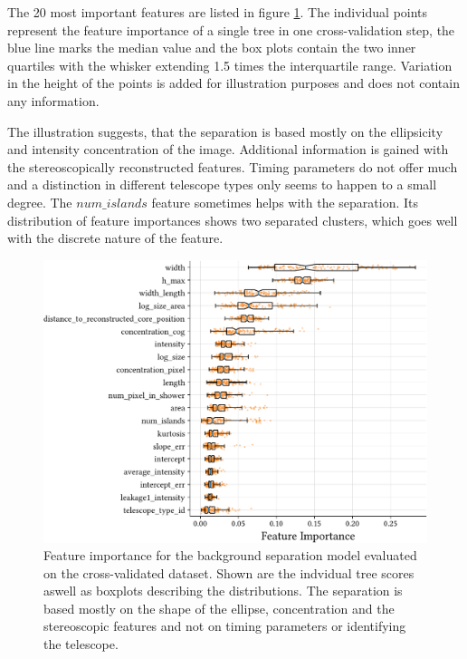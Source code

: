 The 20 most important features are listed in figure \ref{fig:gh_features}.
The individual points represent the feature importance of a single tree in one
cross-validation step, the blue line marks the median value and the box plots
contain the two inner quartiles with the whisker extending \num{1.5} times the
interquartile range.
Variation in the height of the points is added for illustration purposes and does not
contain any information.

The illustration suggests, that the separation is based mostly on the ellipsicity
and intensity concentration of the image. Additional information is gained
with the stereoscopically reconstructed features.
Timing parameters do not offer much and a distinction in different telescope types
only seems to happen to a small degree.
The $num\_islands$ feature sometimes helps with the separation.
Its distribution of feature importances shows two separated
clusters, which goes well with the discrete nature of the feature.


\begin{figure}
    \centering
    \captionsetup{width=0.9\textwidth}
    \hspace*{-0.1\textwidth}\includegraphics[page=1, width=.6\textwidth]{../analysis/plots/separation_features.pdf}
    \caption{Feature importance for the background separation model evaluated on the cross-validated dataset.
    Shown are the indvidual tree scores aswell as boxplots describing the distributions.
    The separation is based mostly on the shape of the ellipse, concentration and
    the stereoscopic features and not on timing parameters or identifying the telescope.}
    \label{fig:gh_features}
\end{figure}
